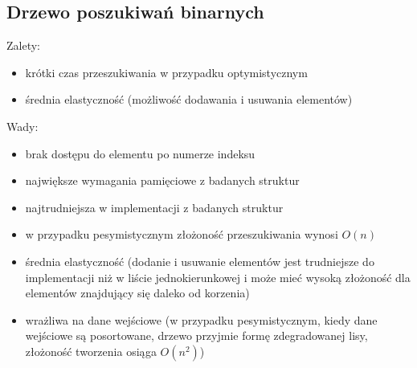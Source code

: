 \documentclass[polish,polish,a4paper]{article}
\begin{document}
\subsection{Drzewo poszukiwań binarnych}
Zalety:
\begin{itemize}
	\item krótki czas przeszukiwania w przypadku optymistycznym
	\item średnia elastyczność (możliwość dodawania i usuwania elementów)
\end{itemize}
Wady:
\begin{itemize}
	\item brak dostępu do elementu po numerze indeksu
	\item największe wymagania pamięciowe z badanych struktur
	\item najtrudniejsza w implementacji z badanych struktur
	\item w przypadku pesymistycznym złożoność przeszukiwania wynosi $O(n)$
	\item średnia elastyczność (dodanie i usuwanie elementów jest trudniejsze do implementacji niż w liście jednokierunkowej i może mieć wysoką złożoność dla elementów znajdujący się daleko od korzenia)
	\item wrażliwa na dane wejściowe (w przypadku pesymistycznym, kiedy dane wejściowe są posortowane, drzewo przyjmie formę zdegradowanej lisy, złożoność tworzenia osiąga $O(n^{2})$)
\end{itemize}

	\newpage
	\tableofcontents
\end{document}

